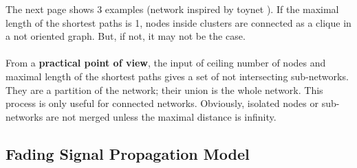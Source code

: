 The next page shows 3 examples (network inspired by toynet ). If the maximal length of the shortest paths is 1, nodes inside clusters are connected as a clique in a not oriented graph. But, if not, it may not be the case.\\\\
From a \textbf{practical point of view}, the input of ceiling number of nodes and maximal length of the shortest paths gives a set of not intersecting sub-networks. They are a partition of the network; their union is the whole network. This process is only useful for connected networks. Obviously, isolated nodes or sub-networks are not merged unless the maximal distance is infinity.

\subsection{Fading Signal Propagation Model}\label{FadeModel}
